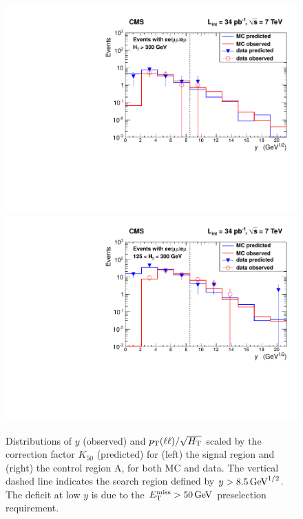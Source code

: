 \begin{figure}[hbt]
\begin{center}
\includegraphics[width=0.49\linewidth]{plots_final/victory_signal.pdf}
\includegraphics[width=0.49\linewidth]{plots_final/victory_control.pdf}
\caption{\label{fig:victory}\protect Distributions of 
$y$ (observed) and ${p_{\mathrm{T}}(\ell\ell)}/\sqrt{H_{\mathrm{T}}}$ scaled by the correction
factor $K_{50}$ (predicted)
for (left) the signal region and (right) the control region A, for both MC and data.
The vertical dashed line indicates the search region defined by $y>8.5\,\text{Ge\hspace{-.08em}V}^{1/2}$.
The deficit at low $y$ is due to the $E_{\mathrm{T}}^{\text{miss}} > 50\,\text{Ge\hspace{-.08em}V}$ preselection requirement.}
\end{center}
\end{figure}




